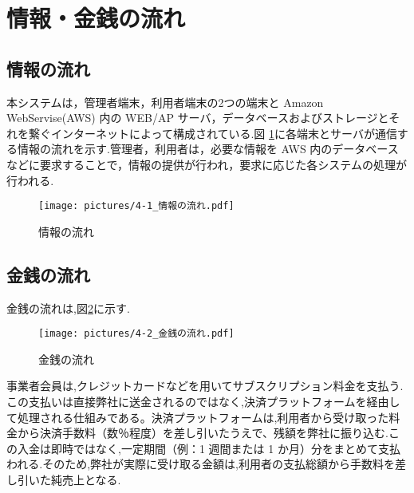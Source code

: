 \section{情報・金銭の流れ}
\subsection{情報の流れ}
本システムは，管理者端末，利用者端末の2つの端末と Amazon WebServise(AWS) 内の WEB/AP サーバ，データベースおよびストレージとそれを繋ぐインターネットによって構成されている.図 \ref{fig:Q7}に各端末とサーバが通信する情報の流れを示す.管理者，利用者は，必要な情報を AWS 内のデータベースなどに要求することで，情報の提供が行われ，要求に応じた各システムの処理が行われる.

\begin{figure}[H]
        \centering
        \texttt{[image: pictures/4-1\_情報の流れ.pdf]}
        \caption{情報の流れ}
        \label{fig:Q7}
\end{figure}



\subsection{金銭の流れ}
金銭の流れは,図\ref{fig:Q8}に示す.

\begin{figure}[H]
        \centering
        \texttt{[image: pictures/4-2\_金銭の流れ.pdf]}
        \caption{金銭の流れ}
        \label{fig:Q8}
\end{figure}

事業者会員は,クレジットカードなどを用いてサブスクリプション料金を支払う.この支払いは直接弊社に送金されるのではなく,決済プラットフォームを経由して処理される仕組みである。決済プラットフォームは,利用者から受け取った料金から決済手数料（数％程度）を差し引いたうえで、残額を弊社に振り込む.この入金は即時ではなく,一定期間（例：1 週間または 1 か月）分をまとめて支払われる.そのため,弊社が実際に受け取る金額は,利用者の支払総額から手数料を差し引いた純売上となる.







